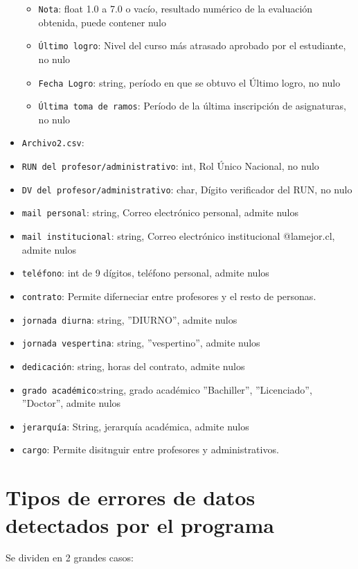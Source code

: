 \documentclass[12pt]{article}
\begin{document}
\begin{itemize}
\begin{itemize}
        \item \texttt{Nota}: float 1.0 a 7.0 o vacío, resultado numérico de la evaluación obtenida, puede contener nulo
        \item \texttt{Último logro}: Nivel del curso más atrasado aprobado por el estudiante, no nulo
        \item \texttt{Fecha Logro}: string, período en que se obtuvo el Último logro, no nulo
        \item \texttt{Última toma de ramos}: Período de la última inscripción de asignaturas, no nulo
    \end{itemize}
    \item \texttt{Archivo2.csv}:
    \item \texttt{RUN del profesor/administrativo}: int, Rol Único Nacional, no nulo
    \item \texttt{DV del profesor/administrativo}: char, Dígito verificador del RUN, no nulo
    \item \texttt{mail personal}: string, Correo electrónico personal, admite nulos
    \item \texttt{mail institucional}: string, Correo electrónico institucional @lamejor.cl, admite nulos
    \item \texttt{teléfono}: int de 9 dígitos, teléfono personal, admite nulos
    \item \texttt{contrato}: Permite diferneciar entre profesores y el resto de personas.
    \item \texttt{jornada diurna}: string, ”DIURNO”, admite nulos
    \item \texttt{jornada vespertina}: string, ”vespertino”, admite nulos
    \item \texttt{dedicación}: string, horas del contrato, admite nulos
    \item \texttt{grado académico}:string, grado académico ”Bachiller”, ”Licenciado”, ”Doctor”, admite nulos
    \item \texttt{jerarquía}: String, jerarquía académica, admite nulos
    \item \texttt{cargo}: Permite disitnguir entre profesores y administrativos.
\end{itemize}
\newpage
\subsection*{}
\section*{Tipos de errores de datos detectados por el programa}
Se dividen en 2 grandes casos:
\end{document}
